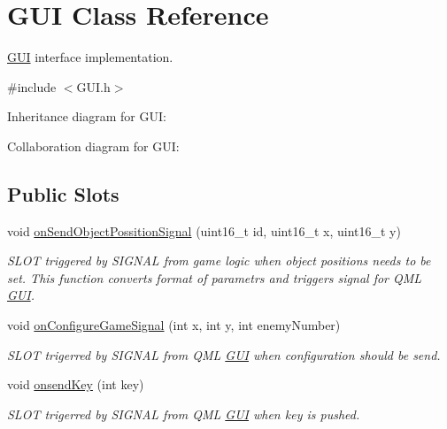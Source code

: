 \hypertarget{class_g_u_i}{\section{G\+U\+I Class Reference}
\label{class_g_u_i}
}


\hyperlink{class_g_u_i}{G\+U\+I} interface implementation.  




{\ttfamily \#include $<$G\+U\+I.\+h$>$}



Inheritance diagram for G\+U\+I\+:


Collaboration diagram for G\+U\+I\+:
\subsection*{Public Slots}
\begin{DoxyCompactItemize}
\item 
void \hyperlink{class_g_u_i_a5bd6d43f0a9c4cc69cfb59a80ef0890a}{on\+Send\+Object\+Possition\+Signal} (uint16\+\_\+t id, uint16\+\_\+t x, uint16\+\_\+t y)
\begin{DoxyCompactList}\small\item\em S\+L\+O\+T triggered by S\+I\+G\+N\+A\+L from game logic when object positions needs to be set. This function converts format of parametrs and triggers signal for Q\+M\+L \hyperlink{class_g_u_i}{G\+U\+I}. \end{DoxyCompactList}\item 
void \hyperlink{class_g_u_i_ae554930b3a591888f79cdb81251aadf9}{on\+Configure\+Game\+Signal} (int x, int y, int enemy\+Number)
\begin{DoxyCompactList}\small\item\em S\+L\+O\+T trigerred by S\+I\+G\+N\+A\+L from Q\+M\+L \hyperlink{class_g_u_i}{G\+U\+I} when configuration should be send. \end{DoxyCompactList}\item 
void \hyperlink{class_g_u_i_afb137f48b842f54516c497c3b555ff80}{onsend\+Key} (int key)
\begin{DoxyCompactList}\small\item\em S\+L\+O\+T trigerred by S\+I\+G\+N\+A\+L from Q\+M\+L \hyperlink{class_g_u_i}{G\+U\+I} when key is pushed. \end{DoxyCompactList}\end{DoxyCompactItemize}
